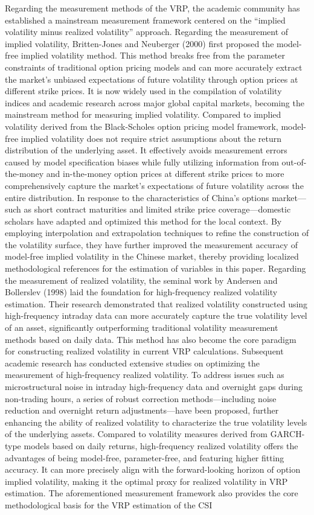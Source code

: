 \documentclass[a4paper, 12pt]{article}    %
\begin{document}
Regarding the measurement methods of the VRP, the academic community has established a mainstream measurement framework centered on the “implied volatility minus realized volatility” approach. Regarding the measurement of implied volatility, Britten-Jones and Neuberger (2000) first proposed the model-free implied volatility method. This method breaks free from the parameter constraints of traditional option pricing models and can more accurately extract the market’s unbiased expectations of future volatility through option prices at different strike prices. It is now widely used in the compilation of volatility indices and academic research across major global capital markets, becoming the mainstream method for measuring implied volatility. Compared to implied volatility derived from the Black-Scholes option pricing model framework, model-free implied volatility does not require strict assumptions about the return distribution of the underlying asset. It effectively avoids measurement errors caused by model specification biases while fully utilizing information from out-of-the-money and in-the-money option prices at different strike prices to more comprehensively capture the market’s expectations of future volatility across the entire distribution. In response to the characteristics of China’s options market—such as short contract maturities and limited strike price coverage—domestic scholars have adapted and optimized this method for the local context. By employing interpolation and extrapolation techniques to refine the construction of the volatility surface, they have further improved the measurement accuracy of model-free implied volatility in the Chinese market, thereby providing localized methodological references for the estimation of variables in this paper. Regarding the measurement of realized volatility, the seminal work by Andersen and Bollerslev (1998) laid the foundation for high-frequency realized volatility estimation. Their research demonstrated that realized volatility constructed using high-frequency intraday data can more accurately capture the true volatility level of an asset, significantly outperforming traditional volatility measurement methods based on daily data. This method has also become the core paradigm for constructing realized volatility in current VRP calculations. Subsequent academic research has conducted extensive studies on optimizing the measurement of high-frequency realized volatility. To address issues such as microstructural noise in intraday high-frequency data and overnight gaps during non-trading hours, a series of robust correction methods—including noise reduction and overnight return adjustments—have been proposed, further enhancing the ability of realized volatility to characterize the true volatility levels of the underlying assets. Compared to volatility measures derived from GARCH-type models based on daily returns, high-frequency realized volatility offers the advantages of being model-free, parameter-free, and featuring higher fitting accuracy. It can more precisely align with the forward-looking horizon of option implied volatility, making it the optimal proxy for realized volatility in VRP estimation. The aforementioned measurement framework also provides the core methodological basis for the VRP estimation of the CSI 
\end{document}
